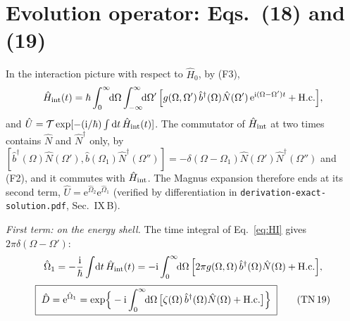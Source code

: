 \documentclass[aps,pra,onecolumn,notitlepage,11pt,amsmath,amssymb,nofootinbib]{revtex4-2}
\newcommand{\Nop}{\hat N}
\newcommand{\dd}{\mathrm{d}}
\newcommand{\ee}{\mathrm{e}}
\newcommand{\ii}{\mathrm{i}}
\newcommand{\TN}[1]{\text{TN\,#1}}
\begin{document}
\section{Evolution operator: Eqs.~(18) and (19)}
\label{sec:U}

In the interaction picture with respect to $\hat H_0$, by (F3),
\begin{equation}
\hat H_{\rm int}(t)=\hbar\int_0^\infty\!\!\dd\Omega\int_{-\infty}^{\infty}\!\!\dd\Omega'\,
\Big[g(\Omega,\Omega')\,\hat b^\dagger(\Omega)\Nop(\Omega')\,\ee^{\ii(\Omega-\Omega')t}+\mathrm{H.c.}\Big],
\label{eq:HI}
\end{equation}
and $\hat U=\mathcal T\exp[-(\ii/\hbar)\int\dd t\,\hat H_{\rm int}(t)]$. The
commutator of $\hat H_{\rm int}$ at two times contains $\Nop$ and
$\Nop^\dagger$ only, by $[\hat b^\dagger(\Omega)\Nop(\Omega'),\hat b(\Omega_1)\Nop^\dagger(\Omega'')]
=-\delta(\Omega-\Omega_1)\Nop(\Omega')\Nop^\dagger(\Omega'')$ and (F2), and it
commutes with $\hat H_{\rm int}$. The Magnus expansion therefore ends at its
second term,
$\hat U=\ee^{\hat\Omega_2}\ee^{\hat\Omega_1}$ (verified by differentiation in
\texttt{derivation-exact-solution.pdf}, Sec.~IX\,B).

\emph{First term: on the energy shell.} The time integral of
Eq.~\eqref{eq:HI} gives $2\pi\delta(\Omega-\Omega')$:
\begin{equation}
\hat\Omega_1=-\frac{\ii}{\hbar}\int\!\dd t\,\hat H_{\rm int}(t)
=-\ii\int_0^\infty\!\!\dd\Omega\,\Big[2\pi g(\Omega,\Omega)\,\hat b^\dagger(\Omega)\Nop(\Omega)+\mathrm{H.c.}\Big],
\end{equation}
\begin{equation}
\boxed{\;\hat D=\ee^{\hat\Omega_1}=\exp\!\Big\{-\ii\int_0^\infty\!\!\dd\Omega\,
\big[\zeta(\Omega)\,\hat b^\dagger(\Omega)\Nop(\Omega)+\mathrm{H.c.}\big]\Big\}\;}
\tag{\TN{19}}
\label{eq:D}
\end{equation}
\end{document}

